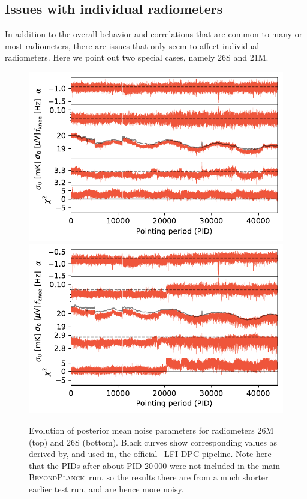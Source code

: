 \documentclass[twocolumn]{aa}
\newcommand{\BP}{\textsc{BeyondPlanck}}
\begin{document}
\subsection{Issues with individual radiometers}
In addition to the overall behavior and correlations that are common to many or most radiometers,
there are issues that only seem to affect individual radiometers. Here we point out two special cases, namely 26S and 21M. 
\begin{figure}
	\begin{center}
		\includegraphics[width=\linewidth]{figs/xi_vs_pid_band_044_det_5_mean_full.pdf}
		\includegraphics[width=\linewidth]{figs/xi_vs_pid_band_044_det_6_mean_full.pdf}
	\end{center}
	\caption{Evolution of posterior mean noise parameters for radiometers 26M (top) and 26S (bottom). Black curves show corresponding values as derived by, and used in, the official \Planck\ LFI DPC pipeline. Note here that the 
	PIDs after about PID 20\,000 were not included in the main \BP\ run, so the results there are from a much shorter
	earlier test run, and are hence more noisy. 
		\label{fig:params_26S}}
\end{figure}
\end{document}
